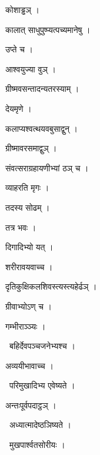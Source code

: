 \documentclass[10pt, openany, oneside]{book}
\begin{document}
\noindent कोशाड्ढञ् ।

\noindent कालात् साधुपुष्प्यत्पच्यमानेषु ।

\noindent उप्ते च ।

\noindent आश्वयुज्या वुञ् ।

\noindent ग्रीष्मवसन्तादन्यतरस्याम् ।

\noindent देयमृणे ।

\noindent कलाप्यश्वत्थयवबुसाद्वुन् ।

\noindent ग्रीष्मावरसमाद्वुञ् ।

\noindent संवत्सराग्रहायणीभ्यां ठञ् च ।

\noindent व्याहरति मृगः ।

\noindent तदस्य सोढम् ।

\noindent तत्र भवः ।

\noindent दिगादिभ्यो यत् ।

\noindent शरीरावयवाच्च ।

\noindent दृतिकुक्षिकलशिवस्त्यस्त्यहेर्ढञ् ।

\noindent ग्रीवाभ्योऽण् च ।

\noindent गम्भीराञ्ञ्यः ।

\par\noindent\hspace{1.5em}{\vps वा॰}~{\qt बहिर्देवपञ्चजनेभ्यश्च ।}

\noindent अव्ययीभावाच्च ।

\par\noindent\hspace{1.5em}{\vps वा॰}~{\qt परिमुखादिभ्य एवेष्यते ।}

\noindent अन्तःपूर्वपदाट्ठञ् ।

\par\noindent\hspace{1.5em}{\vps वा॰}~{\qt अध्यात्मादेष्ठञिष्यते ।}

\par\noindent\hspace{1.5em}{\vps वा॰}~{\qt मुखपार्श्वतसोरीयः ।}
\end{document}
